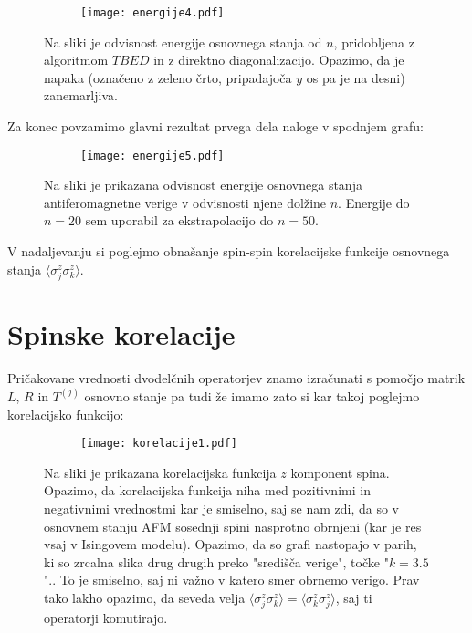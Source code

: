 \documentclass{article}
\begin{document}
\begin{figure}[H]
\centering
\begin{subfigure}{.8\textwidth}
\texttt{[image: energije4.pdf]}
\end{subfigure}
\caption*{Na sliki je odvisnost energije osnovnega stanja od $n$, pridobljena z algoritmom $TBED$ in z direktno diagonalizacijo. Opazimo, da je napaka (označeno z zeleno črto, pripadajoča $y$ os pa je na desni) zanemarljiva.}
\end{figure}


Za konec povzamimo glavni rezultat prvega dela naloge v spodnjem grafu:

\begin{figure}[H]
\centering
\begin{subfigure}{.8\textwidth}
\texttt{[image: energije5.pdf]}
\end{subfigure}
\caption*{Na sliki je prikazana odvisnost energije osnovnega stanja antiferomagnetne verige v odvisnosti njene dolžine $n$. Energije do $n=20$ sem uporabil za ekstrapolacijo do $n=50$.}
\end{figure}

V nadaljevanju si poglejmo obnašanje spin-spin korelacijske funkcije osnovnega stanja $\langle \sigma_j^z \sigma_k^z \rangle$.

\section*{Spinske korelacije}
Pričakovane vrednosti dvodelčnih operatorjev znamo izračunati s pomočjo matrik $L$, $R$ in $T^{(j)}$ osnovno stanje pa tudi že imamo zato si kar takoj poglejmo korelacijsko funkcijo:

\begin{figure}[H]
\centering
\begin{subfigure}{.8\textwidth}
\texttt{[image: korelacije1.pdf]}
\end{subfigure}
\caption*{Na sliki je prikazana korelacijska funkcija $z$ komponent spina. Opazimo, da korelacijska funkcija niha med pozitivnimi in negativnimi vrednostmi kar je smiselno, saj se nam zdi, da so v osnovnem stanju AFM sosednji spini nasprotno obrnjeni (kar je res vsaj v Isingovem modelu). Opazimo, da so grafi nastopajo v parih, ki so zrcalna slika drug drugih preko "središča verige", točke "$k=3.5$".. To je smiselno, saj ni važno v katero smer obrnemo verigo. Prav tako lakho opazimo, da seveda velja $\langle \sigma_j^z \sigma_k^z \rangle = \langle \sigma_k^z \sigma_j^z \rangle$, saj ti operatorji komutirajo.}
\end{figure}
\end{document}
